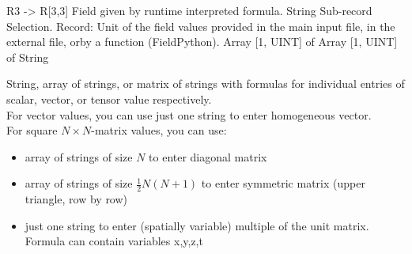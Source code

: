 \begin{RecordType}
	{}
	{} %
	{} %
	{} %
	{{{R3 -{\textgreater} R[3,3] Field given by runtime interpreted formula.}}}
		\KeyItem
			{}
			{{String}}
			{\textrangle}
			{} %
			{{{Sub-record Selection.}}}
		\KeyItem
			{}
			{{Record}{: }}
			{\textrangle}
			{} %
			{{{Unit of the field values provided in the main input file, in the external file, orby a function (FieldPython).}}}
		\KeyItem
			{}
			{{Array [1, UINT] of }{Array [1, UINT] of }{String}}
			{\textrangle}
			{} %
			{{{{String, array of strings, or matrix of strings with formulas for individual entries of scalar, vector, or tensor value respectively.}\\{
For vector values, you can use just one string to enter homogeneous vector.}\\{
For square }{$N\times N$}{-matrix values, you can use:}
}
\begin{itemize}
\item {array of strings of size }{$N$}{ to enter diagonal matrix}
\item {array of strings of size }{$\frac12N(N+1)$}{ to enter symmetric matrix (upper triangle, row by row)}
\item {just one string to enter (spatially variable) multiple of the unit matrix.}\\{
Formula can contain variables }\ttfamily x,y,z,t
\end{itemize}
}}
\end{RecordType}
